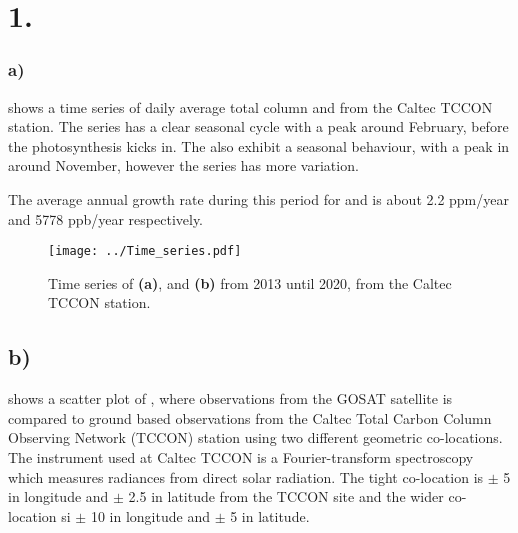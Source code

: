 \section*{1.}

\subsubsection*{a)}  shows a time series of
daily average total column  and  from the Caltec TCCON station.
The  series has a 
clear seasonal cycle with a peak around February, before the photosynthesis
kicks in. The  also exhibit a
seasonal behaviour, with a peak in  around November, however the
 series has more variation. 

The average annual growth rate during this period for  and  is
about 2.2 ppm/year and 5778 ppb/year respectively.  
 
\begin{figure}[htbp]
    \texttt{[image: ../Time\_series.pdf]}
    \centering
    \caption{Time series of  \textbf{(a)}, and  \textbf{(b)} from 2013 until 2020, from the Caltec TCCON station.}
    \label{fig:Time_series_XCH4_XCO2}

\end{figure}

\subsection*{b)}
 shows a scatter plot of , where observations
from the GOSAT satellite is compared to ground based observations from
the Caltec Total Carbon Column Observing Network (TCCON) station using two
different geometric co-locations. The instrument used at Caltec TCCON is a
Fourier-transform spectroscopy which measures radiances from direct
solar radiation. The tight co-location is $\pm$ 5 \degree in
longitude and $\pm$ 2.5 \degree in latitude from the TCCON site and the wider
co-location si $\pm$ 10 \degree in longitude and $\pm$
5 \degree in latitude.

